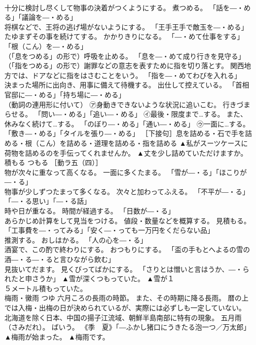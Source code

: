 \documentclass[8pt]{extreport}
\begin{document}
\begin{CJK}{UTF8}{min}
\\	十分に検討し尽くして物事の決着がつくようにする。 煮つめる。 「話を―・める」「議論を―・める」 
\\	将棋などで、王将の逃げ場がないようにする。 「王手王手で敵玉を―・める」 
\\	たゆまずその事を続けてする。 かかりきりになる。 「―・めて仕事をする」「根（こん）を―・める」 
\\	（「息をつめる」の形で）呼吸を止める。 「息を―・めて成り行きを見守る」 
\\	（「指をつめる」の形で）謝罪などの意志を表すために指を切り落とす。 関西地方では、ドアなどに指をはさむことをいう。 「指を―・めてわびを入れる」 
\\	決まった場所に出向き、用事に備えて待機する。 出仕して控えている。 「首相官邸に―・める」「持ち場に―・める」 
\\	（動詞の連用形に付いて） ㋐身動きできないような状況に追いこむ。 行きづまらせる。 「問い―・める」「追い―・める」 ㋑最後・限度まで…する。 また、休みなく続けて…する。 「のぼり―・める」「通い―・める」 ㋒一面に…する。 「敷き―・める」「タイルを張り―・める」 ［下接句］息を詰める・石で手を詰める・根（こん）を詰める・道理を詰める・指を詰める	▲私がスーツケースに荷物を詰めるのを手伝ってくれませんか。 ▲丈を少し詰めていただけますか。
\\	積もる	つもる	［動ラ五（四）］ 
\\	物が次々に重なって高くなる。 一面に多くたまる。 「雪が―・る」「ほこりが―・る」 
\\	物事が少しずつたまって多くなる。 次々と加わってふえる。 「不平が―・る」「―・る思い」「―・る話」 
\\	時や日が重なる。 時間が経過する。 「日数が―・る」 
\\	あらかじめ計算をして見当をつける。 値段・数量などを概算する。 見積もる。 「工事費を―・ってみる」「安く―・っても一万円をくだらない品」 
\\	推測する。 おしはかる。 「人の心を―・る」 
\\	酒宴で、この酌で終わりにする。 おつもりにする。 「盃の手もとへよるの雪の酒―・る―・ると言ひながら飲む」 
\\	見抜いてだます。 見くびってばかにする。 「さりとは憎いと言はうか、―・られたと申さうか」	▲雪が深くつもっていた。 ▲雪が１
\\	５メートル積もっていた。
\\	梅雨・黴雨	つゆ	六月ころの長雨の時節。 また、その時期に降る長雨。 暦の上では入梅・出梅の日が決められているが、実際には必ずしも一定していない。 北海道を除く日本、中国の揚子江流域、朝鮮半島南部に特有の現象。 五月雨（さみだれ）。 ばいう。 《季　夏》「―ふかし猪口にうきたる泡一つ／万太郎」	▲梅雨が始まった。 ▲梅雨です。

\end{CJK}
\end{document}
